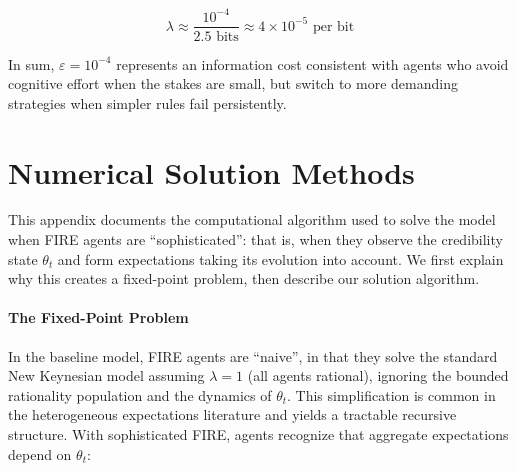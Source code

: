 \documentclass[10pt]{article}
\begin{document}
\begin{equation}
\lambda \approx \frac{10^{-4}}{2.5 \text{ bits}} \approx 4 \times 10^{-5} \text{ per bit}
\end{equation}

In sum, $\varepsilon = 10^{-4}$ represents an information cost consistent with agents who avoid cognitive effort when the stakes are small, but switch to more demanding strategies when simpler rules fail persistently.


\section{Numerical Solution Methods}
\label{app:computational}

This appendix documents the computational algorithm used to solve the model when FIRE agents are ``sophisticated'': that is, when they observe the credibility state $\theta_t$ and form expectations taking its evolution into account. We first explain why this creates a fixed-point problem, then describe our solution algorithm.

\paragraph{The Fixed-Point Problem} In the baseline model, FIRE agents are ``naive'', in that they solve the standard New Keynesian model assuming $\lambda = 1$ (all agents rational), ignoring the bounded rationality population and the dynamics of $\theta_t$. This simplification is common in the heterogeneous expectations literature \citep[e.g.,][]{degrauwe2011}  and yields a tractable recursive structure. With sophisticated FIRE, agents recognize that aggregate expectations depend on $\theta_t$:
  
\end{document}
